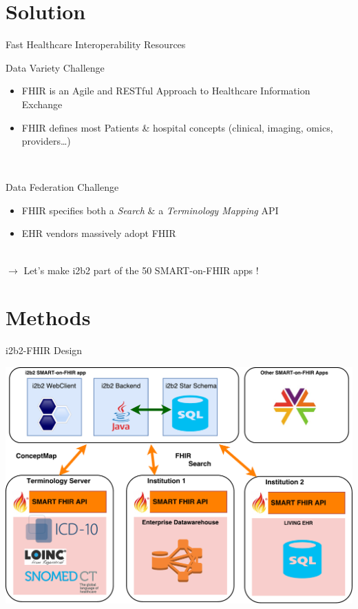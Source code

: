 \documentclass[10pt]{beamer}
\begin{document}
\section{Solution}
\begin{frame}{Fast Healthcare Interoperability Resources}{}

\begin{block}{Data Variety Challenge}
\begin{itemize}
\item FHIR is an Agile and RESTful Approach to Healthcare Information Exchange
\item FHIR defines most Patients \& hospital concepts (clinical, imaging, omics, providers\ldots)
\end{itemize}
\end{block}
~\\
\begin{block}{Data Federation Challenge} 
\begin{itemize}
	\item FHIR specifies both a \emph{Search} \& a \emph{Terminology Mapping} API
	\item EHR vendors massively adopt FHIR
\end{itemize}
\end{block}

~\\
$\rightarrow$ Let's make i2b2 part of the 50 SMART-on-FHIR apps !
\end{frame}

\section{Methods}
\begin{frame}{i2b2-FHIR Design}{}

\includegraphics[height=.8\textheight]{images/overall.pdf}
\end{frame}
\end{document}
